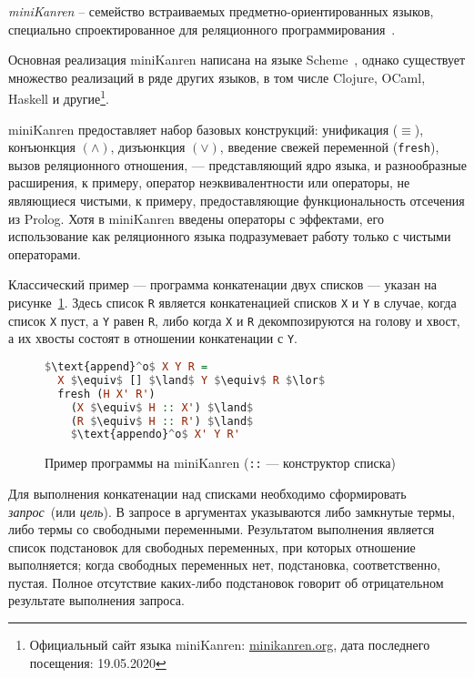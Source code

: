 {\it miniKanren} -- семейство встраиваемых предметно-ориентированных языков,
специально спроектированное для реляционного программирования~\cite{byrdMK}.

Основная реализация miniKanren написана на языке Scheme~\cite{reasonedSchemer},
однако существует множество реализаций в ряде других языков, в том числе
Clojure, OCaml, Haskell и другие\footnote{Официальный сайт языка miniKanren: \url{minikanren.org}, дата последнего посещения: 19.05.2020}.

miniKanren предоставляет набор базовых конструкций: унификация ($\equiv$),
конъюнкция $(\land)$, дизъюнкция $(\lor)$, введение свежей переменной
(\lstinline{fresh}), вызов реляционного отношения,
--- представляющий ядро языка, и разнообразные расширения, к примеру, оператор неэквивалентности
 или операторы, не являющиеся чистыми, к примеру, предоставляющие функциональность
отсечения из Prolog. Хотя в miniKanren введены операторы с эффектами,
его использование как реляционного языка подразумевает работу только с чистыми операторами.

Классический пример --- программа конкатенации двух списков --- указан
на рисунке~\ref{fig:appendo}.
Здесь список \lstinline{R} является конкатенацией списков \lstinline{X} и
\lstinline{Y} в случае, когда список \lstinline{X} пуст, а \lstinline{Y}
равен \lstinline{R}, либо когда \lstinline{X} и \lstinline{R} декомпозируются
на голову и хвост, а их хвосты состоят в отношении конкатенации с \lstinline{Y}.

\begin{figure}[h!]
\begin{lstlisting}[mathescape,language=Haskell,extendedchars=\true,frame=single,basicstyle=\ttfamily]
$\text{append}^o$ X Y R =
  X $\equiv$ [] $\land$ Y $\equiv$ R $\lor$
  fresh (H X' R')
    (X $\equiv$ H :: X') $\land$
    (R $\equiv$ H :: R') $\land$
    $\text{appendo}^o$ X' Y R'
\end{lstlisting}

\caption{Пример программы на miniKanren (\lstinline{::} --- конструктор списка)}
\label{fig:appendo}
\end{figure}

Для выполнения конкатенации над списками необходимо сформировать
\emph{запрос}~(или \emph{цель}).
В запросе в аргументах указываются либо замкнутые термы, либо термы
со свободными переменными. Результатом выполнения является список
подстановок для свободных переменных, при которых отношение выполняется;
когда свободных переменных нет, подстановка, соответственно, пустая.
Полное отсутствие каких-либо подстановок говорит об отрицательном результате
выполнения запроса.

